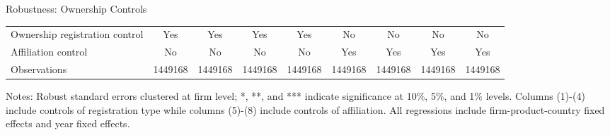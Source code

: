 \documentclass[10pt]{beamer}
\begin{document}
\begin{frame}{Robustness: Ownership Controls}
\begin{table}[htbp]
{\begin{threeparttable}
\begin{tabular}{lcccccccc}
			Ownership registration control &  Yes   & Yes & Yes  & Yes & No & No & No & No\\
			Affiliation control & No & No & No & No &  Yes  & Yes & Yes  & Yes \\
			Observations & 1449168 & 1449168 & 1449168 & 1449168 & 1449168 & 1449168 & 1449168 & 1449168\\
			\bottomrule
		\end{tabular}
		\begin{tablenotes}
			\footnotesize
			\item Notes: Robust standard errors clustered at firm level; *, **, and *** indicate significance at 10\%, 5\%, and 1\% levels. Columns (1)-(4) include controls of registration type while columns (5)-(8) include controls of affiliation. All regressions include firm-product-country fixed effects and year fixed effects.
		\end{tablenotes}
	\end{threeparttable}
        }
	\label{tab.robust.ownership}
    \end{table}
    \hyperlink{robustness_other}{}
\end{frame}
\end{document}
